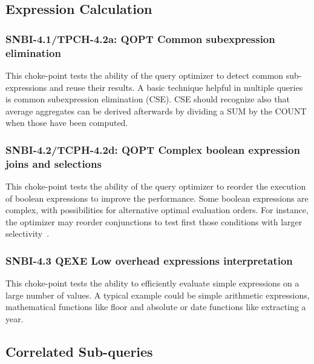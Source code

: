 \subsection{Expression Calculation}

\subsubsection{SNBI-4.1/TPCH-4.2a: QOPT Common subexpression elimination}
\label{choke_point_4.1}
This choke-point tests the ability of the query optimizer to detect common sub-expressions and reuse their results. A basic technique helpful in multiple queries is common subexpression elimination (CSE).
CSE should recognize also that average aggregates can be derived afterwards by dividing a SUM by the COUNT when those have been computed.

\subsubsection{SNBI-4.2/TCPH-4.2d: QOPT Complex boolean expression joins and selections}
\label{choke_point_4.2}
This choke-point tests the ability of the query optimizer to reorder the execution of boolean expressions to improve the performance. Some boolean expressions are complex, with possibilities for alternative optimal evaluation orders.
For instance, the optimizer may reorder conjunctions to test first those conditions with larger selectivity~\cite{DBLP:conf/vldb/Moerkotte98}.

\subsubsection{SNBI-4.3 QEXE Low overhead expressions interpretation}
\label{choke_point_4.3}
This choke-point tests the ability to efficiently evaluate simple expressions on a large number of values. A typical example could be simple arithmetic expressions, mathematical functions like floor and absolute or date functions like extracting a year.

\subsection{Correlated Sub-queries}

